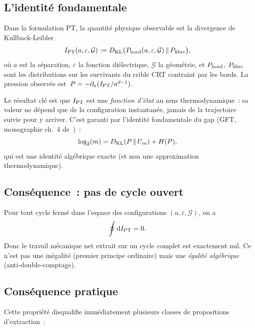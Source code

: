 \documentclass[11pt,a4paper]{article}
\newcommand{\IPT}{I_{\rm PT}}
\begin{document}
\subsection{L'identité fondamentale}

Dans la formulation PT, la quantité physique observable est la divergence de Kullback-Leibler
\begin{equation}
\IPT(a, \varepsilon, \mathcal{G}) := D_{\rm KL}\bigl(P_{\rm bord}(a,\varepsilon,\mathcal{G})\,\|\,P_{\rm libre}\bigr),
\label{eq:I-PT}
\end{equation}
où $a$ est la séparation, $\varepsilon$ la fonction diélectrique, $\mathcal{G}$ la géométrie, et
$P_{\rm bord}$, $P_{\rm libre}$ sont les distributions sur les survivants du crible CRT
contraint par les bords. La pression observée est~$P = -\partial_{a}(\IPT/a^{d-1})$.

Le résultat clé est que $\IPT$ est une \emph{fonction d'état} au sens thermodynamique~: sa
valeur ne dépend que de la configuration instantanée, jamais de la trajectoire suivie pour
y arriver. C'est garanti par l'identité fondamentale du gap (GFT, monographie ch.~4
de~\cite{Senez2026})~:
\begin{equation}
\log_{2}(m) = D_{\rm KL}(P\,\|\,U_{m}) + H(P),
\label{eq:gft}
\end{equation}
qui est une identité algébrique exacte (et non une approximation thermodynamique).

\subsection{Conséquence~: pas de cycle ouvert}

Pour tout cycle fermé dans l'espace des configurations $(a, \varepsilon, \mathcal{G})$, on a
\begin{equation}
\oint \mathrm{d}\IPT = 0.
\label{eq:closed-cycle}
\end{equation}
Donc le travail mécanique net extrait sur un cycle complet est exactement nul. Ce n'est pas une
inégalité (premier principe ordinaire) mais une \emph{égalité algébrique} (anti-double-comptage).

\subsection{Conséquence pratique}

Cette propriété disqualifie immédiatement plusieurs classes de propositions d'extraction~:
\end{document}
